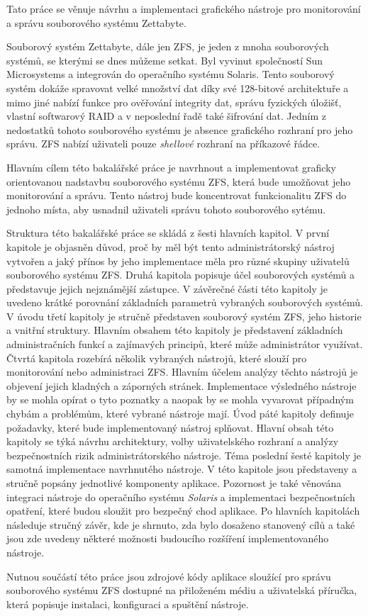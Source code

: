 Tato práce se věnuje návrhu a implementaci grafického nástroje pro monitorování a správu souborového systému Zettabyte.

Souborový systém Zettabyte, dále jen ZFS, je jeden z mnoha souborových systémů, se kterými se dnes můžeme setkat.
Byl vyvinut společností Sun Microsystems a integrován do operačního systému Solaris. Tento souborový systém dokáže spravovat velké množství dat
díky své 128-bitové architektuře a mimo jiné nabízí funkce pro ověřování integrity dat, správu fyzických úložišť, vlastní softwarový RAID a v neposlední
řadě také šifrování dat. Jedním z nedostatků tohoto souborového systému je absence grafického rozhraní pro jeho správu. ZFS nabízí uživateli pouze \emph{shellové} rozhraní na příkazové řádce.

Hlavním cílem této bakalářské práce je navrhnout a implementovat graficky orientovanou nadstavbu souborového systému ZFS, která bude umožňovat jeho monitorování a správu. Tento nástroj bude koncentrovat funkcionalitu ZFS do jednoho místa, aby usnadnil uživateli správu tohoto souborového sytému.

Struktura této bakalářské práce se skládá z šesti hlavních kapitol.
V první kapitole je objasněn důvod, proč by měl být tento administrátorský nástroj vytvořen a jaký přínos by jeho implementace měla pro různé skupiny uživatelů souborového systému ZFS.
Druhá kapitola popisuje účel souborových systémů a představuje jejich nejznámější zástupce. V závěrečné části této kapitoly je uvedeno krátké porovnání základních parametrů vybraných souborových systémů.
V úvodu třetí kapitoly je stručně představen souborový systém ZFS, jeho historie a vnitřní struktury. Hlavním obsahem této kapitoly je představení základních administračních funkcí a zajímavých principů, které může administrátor využívat.
Čtvrtá kapitola rozebírá několik vybraných nástrojů, které slouží pro monitorování nebo administraci ZFS. Hlavním účelem analýzy těchto nástrojů je objevení jejich kladných a záporných stránek. Implementace výsledného nástroje by se mohla opírat o tyto poznatky a naopak by se mohla vyvarovat případným chybám a problémům, které vybrané nástroje mají.
Úvod páté kapitoly definuje požadavky, které bude implementovaný nástroj splňovat. Hlavní obsah této kapitoly se týká návrhu architektury, volby uživatelského rozhraní a analýzy bezpečnostních rizik administrátorského nástroje.
Téma poslední šesté kapitoly je samotná implementace navrhnutého nástroje. V této kapitole jsou představeny a stručně popsány jednotlivé komponenty aplikace. Pozornost je také věnována integraci nástroje do operačního systému \emph{Solaris} a implementaci bezpečnostních opatření, které budou sloužit pro bezpečný chod aplikace.
Po hlavních kapitolách následuje stručný závěr, kde je shrnuto, zda bylo dosaženo stanovený cílů a také jsou zde uvedeny některé možnosti budoucího rozšíření implementovaného nástroje.

Nutnou součástí této práce jsou zdrojové kódy aplikace sloužící pro správu souborového systému ZFS dostupné na přiloženém médiu a uživatelská příručka, která popisuje instalaci, konfiguraci a spuštění nástroje.



